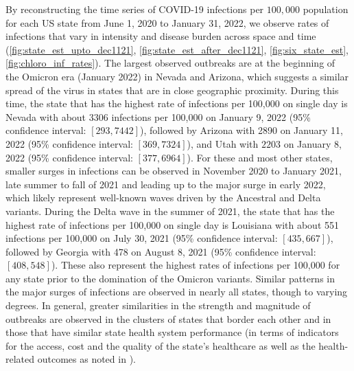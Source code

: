 \documentclass{article}
\begin{document}
By reconstructing the time series of COVID-19 infections per $100,000$
population for each US state from June 1, 2020 to January 31, 2022, we observe
rates of infections that vary in intensity and disease burden across space and
time (\autoref{fig:state_est_upto_dec1121}, \autoref{fig:state_est_after_dec1121},
 \autoref{fig:six_state_est}, \autoref{fig:chloro_inf_rates}). The
largest observed outbreaks are at the beginning of the Omicron era (January
2022) in Nevada and Arizona, which suggests a similar spread of the virus in
states that are in close geographic proximity. During this time, the state that
has the highest rate of infections per 100,000 on single day is Nevada with
about 3306 infections per 100,000 on January 9, 2022 (95\% confidence interval:
$[293, 7442]$), followed by Arizona with 2890 on January 11, 2022 (95\%
confidence interval: $[369, 7324]$), and Utah with $2203$ on January 8, 2022
(95\% confidence interval: $[377, 6964]$). For these and most other states,
smaller surges in infections can be observed in November 2020 to January 2021,
late summer to fall of 2021 and leading up to the major surge in early 2022,
which likely represent well-known waves driven by the Ancestral and Delta
variants. During the Delta wave in the summer of 2021, the state that has the
highest rate of infections per 100,000 on single day is Louisiana with about
551 infections per 100,000 on July 30, 2021 (95\% confidence interval:
$[435, 667]$), followed by Georgia with 478 on August 8, 2021 (95\%
confidence interval: $[408, 548]$). These also represent the highest rates of
infections per 100,000 for any state prior to the domination of the Omicron
variants. Similar patterns in the major surges of infections are observed in
nearly all states, though to varying degrees. In general, greater similarities
in the strength and magnitude of outbreaks are observed in the clusters of
states that border each other and in those that have similar state health system
performance (in terms of indicators for the access, cost and the quality of the
state's healthcare as well as the health-related outcomes as noted in
\citet{radley2020}). 
\end{document}
